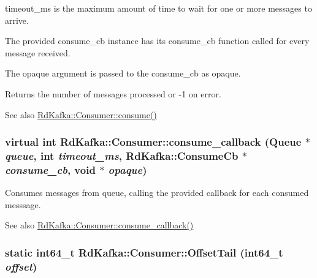 {\ttfamily timeout\_\-ms} is the maximum amount of time to wait for one or more messages to arrive.

The provided {\ttfamily consume\_\-cb} instance has its {\ttfamily consume\_\-cb} function called for every message received.

The {\ttfamily opaque} argument is passed to the {\ttfamily consume\_\-cb} as {\ttfamily opaque}.

\begin{DoxyReturn}{Returns}
the number of messages processed or -\/1 on error.
\end{DoxyReturn}
\begin{DoxySeeAlso}{See also}
\hyperlink{classRdKafka_1_1Consumer_a0afd32e342283fc10fa6f32cc25950b7}{RdKafka::Consumer::consume()} 
\end{DoxySeeAlso}
\hypertarget{classRdKafka_1_1Consumer_a992d17b68c36e500cfa7332c23d112ba}{
\subsubsection[{consume\_\-callback}]{\setlength{\rightskip}{0pt plus 5cm}virtual int RdKafka::Consumer::consume\_\-callback ({\bf Queue} $\ast$ {\em queue}, \/  int {\em timeout\_\-ms}, \/  {\bf RdKafka::ConsumeCb} $\ast$ {\em consume\_\-cb}, \/  void $\ast$ {\em opaque})}}
\label{classRdKafka_1_1Consumer_a992d17b68c36e500cfa7332c23d112ba}


Consumes messages from {\ttfamily queue}, calling the provided callback for each consumed messsage. \begin{DoxySeeAlso}{See also}
\hyperlink{classRdKafka_1_1Consumer_a15a3e64a1ed777804df8b4ea02a40887}{RdKafka::Consumer::consume\_\-callback()} 
\end{DoxySeeAlso}
\hypertarget{classRdKafka_1_1Consumer_a7ad238e24f96a58540f96714e1e292b0}{
\subsubsection[{OffsetTail}]{\setlength{\rightskip}{0pt plus 5cm}static int64\_\-t RdKafka::Consumer::OffsetTail (int64\_\-t {\em offset})}}
\label{classRdKafka_1_1Consumer_a7ad238e24f96a58540f96714e1e292b0}


